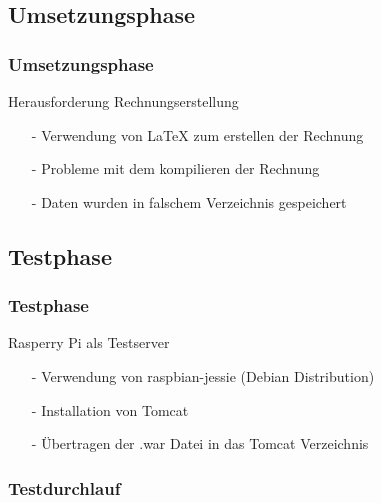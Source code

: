 \documentclass[12pt]{beamer}
\begin{document}
\subsection{Umsetzungsphase}
\begin{frame}
\frametitle{Umsetzungsphase}

\begin{Large}
Herausforderung Rechnungserstellung \vspace{0.2 cm}
\end{Large}

\begin{itemize}
	\item[-] Verwendung von \LaTeX \hspace{0.05 cm} zum erstellen der Rechnung
	\item[-] Probleme mit dem kompilieren der Rechnung
	\item[-] Daten wurden in falschem Verzeichnis gespeichert
\end{itemize}

\end{frame}




\subsection{Testphase}

\begin{frame}
\frametitle{Testphase}

\begin{Large}
	Rasperry Pi als Testserver \vspace{0.2 cm}
\end{Large}
	\begin{itemize}
		\item[-] Verwendung von raspbian-jessie (Debian Distribution)
		\item[-] Installation von Tomcat 
		\item[-] Übertragen der .war Datei in das Tomcat Verzeichnis 
	\end{itemize}
\end{frame}

\subsubsection{Testdurchlauf}
\end{document}
